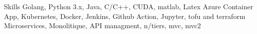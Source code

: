 
\begin{rubric}{Skills}
%
	Golang, Python $3$.x, Java,  C/C++, CUDA, matlab, Latex 
%
	Azure Container App, Kubernetes, Docker, Jenkins, Github Action, Jupyter, tofu and terraform
%
	Microservices, Monolitique, API managment, n/tiers, mvc, mvc2
\end{rubric}
